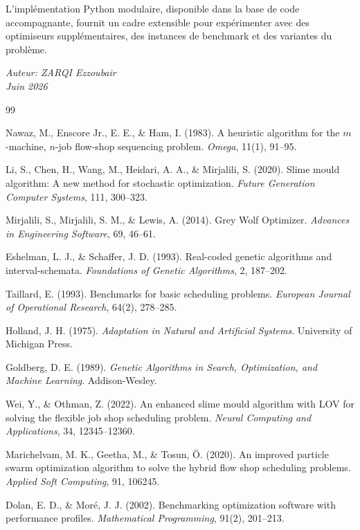 \documentclass[12pt,a4paper,oneside]{report}
\begin{document}
L'impl\'ementation Python modulaire, disponible dans la base de code accompagnante, fournit un cadre extensible pour exp\'erimenter avec des optimiseurs suppl\'ementaires, des instances de benchmark et des variantes du probl\`eme.

\vspace{1cm}

\noindent\textit{Auteur: ZARQI Ezzoubair}\\
\textit{Juin 2026}

\begin{thebibliography}{99}


Nawaz, M., Enscore Jr., E. E., \& Ham, I. (1983).
A heuristic algorithm for the $m$-machine, $n$-job flow-shop sequencing problem.
\textit{Omega}, 11(1), 91--95.

Li, S., Chen, H., Wang, M., Heidari, A. A., \& Mirjalili, S. (2020).
Slime mould algorithm: A new method for stochastic optimization.
\textit{Future Generation Computer Systems}, 111, 300--323.

Mirjalili, S., Mirjalili, S. M., \& Lewis, A. (2014).
Grey Wolf Optimizer.
\textit{Advances in Engineering Software}, 69, 46--61.

Eshelman, L. J., \& Schaffer, J. D. (1993).
Real-coded genetic algorithms and interval-schemata.
\textit{Foundations of Genetic Algorithms}, 2, 187--202.

Taillard, E. (1993).
Benchmarks for basic scheduling problems.
\textit{European Journal of Operational Research}, 64(2), 278--285.

Holland, J. H. (1975).
\textit{Adaptation in Natural and Artificial Systems}.
University of Michigan Press.

Goldberg, D. E. (1989).
\textit{Genetic Algorithms in Search, Optimization, and Machine Learning}.
Addison-Wesley.

Wei, Y., \& Othman, Z. (2022).
An enhanced slime mould algorithm with LOV for solving the flexible job shop scheduling problem.
\textit{Neural Computing and Applications}, 34, 12345--12360.

Marichelvam, M. K., Geetha, M., \& Tosun, Ö. (2020).
An improved particle swarm optimization algorithm to solve the hybrid flow shop scheduling problems.
\textit{Applied Soft Computing}, 91, 106245.

Dolan, E. D., \& Mor\'{e}, J. J. (2002).
Benchmarking optimization software with performance profiles.
\textit{Mathematical Programming}, 91(2), 201--213.

\end{thebibliography}
\end{document}
